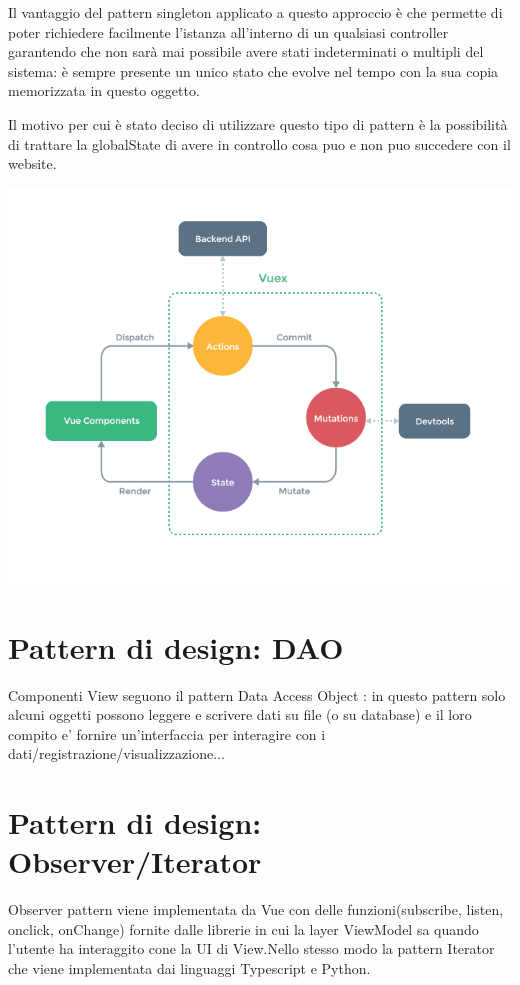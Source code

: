 \documentclass[ 4paper,11pt,openany]{book}
\begin{document}
Il vantaggio del pattern singleton applicato a questo approccio è che permette di poter richiedere facilmente l'istanza all'interno di un qualsiasi controller garantendo che non sarà mai possibile avere stati indeterminati o multipli del sistema: è sempre presente un unico stato che evolve nel tempo con la sua copia memorizzata in questo oggetto.
	
Il motivo per cui è stato deciso di utilizzare questo tipo di pattern è la possibilità di trattare la globalState di avere in controllo cosa puo e non puo succedere con il website.
\begin{center}
	\includegraphics[width=170mm]{Vuevuex.png}
\end{center}
	
\section{Pattern di design: DAO}
Componenti View seguono il pattern Data Access Object : in questo pattern solo alcuni oggetti possono leggere e scrivere dati su file (o su database) e il loro compito e' fornire un'interfaccia per interagire con i dati/registrazione/visualizzazione...
	
	
\section{Pattern di design: Observer/Iterator}
Observer pattern viene implementata da Vue con delle funzioni(subscribe, listen, onclick, onChange) fornite dalle librerie in cui la layer ViewModel sa quando l'utente ha interaggito cone la UI di View.Nello stesso modo la pattern Iterator che viene implementata dai linguaggi Typescript e Python.
	
\end{document}
